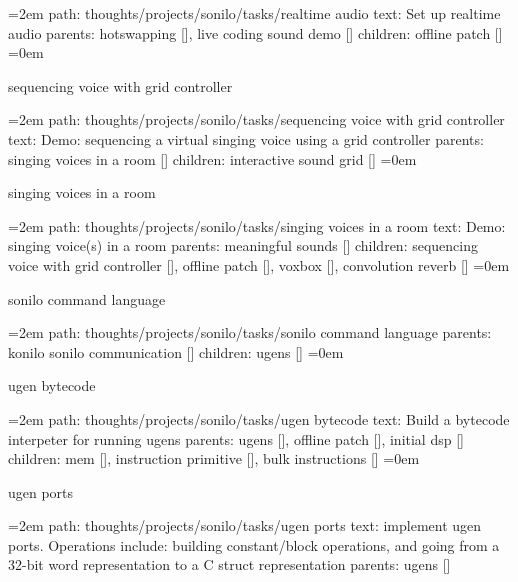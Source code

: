 \leftskip=2em
path: thoughts/projects/sonilo/tasks/realtime audio
\smallskip
text:  Set up realtime audio
\smallskip
parents:  hotswapping [], live coding sound demo []
\smallskip
children: offline patch []
\smallskip
\leftskip=0em
\par\endgroup
\bigskip
{}
sequencing voice with grid controller
\smallskip
\par\begingroup
\leftskip=2em
path: thoughts/projects/sonilo/tasks/sequencing voice with grid controller
\smallskip
text:  Demo: sequencing a virtual singing voice using a grid controller
\smallskip
parents:  singing voices in a room []
\smallskip
children: interactive sound grid []
\smallskip
\leftskip=0em
\par\endgroup
\bigskip
{}
singing voices in a room
\smallskip
\par\begingroup
\leftskip=2em
path: thoughts/projects/sonilo/tasks/singing voices in a room
\smallskip
text:  Demo: singing voice(s) in a room
\smallskip
parents:  meaningful sounds []
\smallskip
children: sequencing voice with grid controller [], offline patch [], voxbox [], convolution reverb []
\smallskip
\leftskip=0em
\par\endgroup
\bigskip
{}
sonilo command language
\smallskip
\par\begingroup
\leftskip=2em
path: thoughts/projects/sonilo/tasks/sonilo command language
\smallskip
parents:  konilo sonilo communication []
\smallskip
children: ugens []
\smallskip
\leftskip=0em
\par\endgroup
\bigskip
{}
ugen bytecode
\smallskip
\par\begingroup
\leftskip=2em
path: thoughts/projects/sonilo/tasks/ugen bytecode
\smallskip
text:  Build a bytecode interpeter for running ugens
\smallskip
parents:  ugens [], offline patch [], initial dsp []
\smallskip
children: mem [], instruction primitive [], bulk instructions []
\smallskip
\leftskip=0em
\par\endgroup
\bigskip
{}
ugen ports
\smallskip
\par\begingroup
\leftskip=2em
path: thoughts/projects/sonilo/tasks/ugen ports
\smallskip
text:  implement ugen ports. Operations include: building constant/block operations, and going from a 32-bit word representation to a C struct representation
\smallskip
parents:  ugens []
